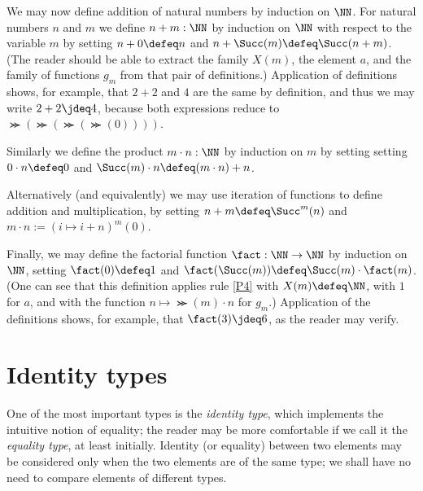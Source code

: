 We may now define addition of natural numbers by induction on $\NN$.  For natural numbers $n$ and $m$ we define $n+m : \NN$ by induction on
$\NN$ with respect to the variable $m$ by setting $n+0\defeq n$ and $n+\Succ(m)\defeq \Succ(n+m)$.  (The reader should be able to extract the
family $X(m)$, the element $a$, and the family of functions $g_m$ from that pair of definitions.)  Application of definitions shows, for
example, that $2+2$ and $4$ are the same by definition, and thus we may write $2+2 \jdeq 4$, because both expressions reduce to
$\Succ(\Succ(\Succ(\Succ(0))))$.

Similarly we define the product $m \cdot n : \NN$ by induction on $m$ by setting setting $ 0 \cdot n \defeq 0$ and
$ \Succ(m) \cdot n \defeq (m \cdot n) + n$.

Alternatively (and equivalently) we may use iteration of functions to define addition and multiplication, by setting $n+m \defeq \Succ^m(n)$ and
$m \cdot n := ( i \mapsto i + n )^m (0) $.

Finally, we may define the factorial function $\fact : \NN \to \NN$ by induction on $\NN$, setting $\fact(0) \defeq 1$ and 
$\fact(\Succ(m)) \defeq \Succ(m) \cdot \fact(m)$.  (One can see that this definition applies rule \ref{P4} with $X(m) \defeq \NN$, with $1$ for
$a$, and with the function $n \mapsto \Succ(m) \cdot n$ for $g_m$.)  Application of the definitions shows, for example, that $\fact(3) \jdeq 6$, as
the reader may verify.

\section{Identity types}
\label{sec:identity-types}

One of the most important types is the \emph{identity type}, which implements the intuitive notion of equality; the reader may be more
comfortable if we call it the \emph{equality type},%
at least initially.  Identity (or equality) between two elements may be considered only when
the two elements are of the same type; we shall have no need to compare elements of different types.


